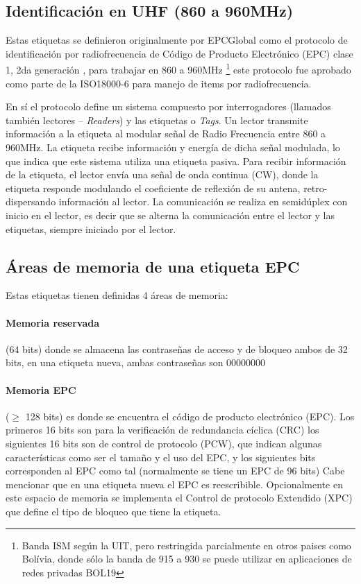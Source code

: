 \documentclass[fleqn,10pt]{SelfArx} %
\begin{document}
\subsection*{Identificación en UHF (860 a 960MHz)}

Estas etiquetas se definieron originalmente por EPCGlobal como el protocolo de identificación por radiofrecuencia de Código de Producto Electrónico (EPC) clase 1, 2da generación \cite{EPCGlobal:2008}, para trabajar en 860 a 960MHz \footnote{Banda ISM según la UIT, pero restringida parcialmente en otros paises como Bolívia, donde sólo la banda de 915 a 930 se puede utilizar en aplicaciones de redes privadas \cite{Telecomunicaciones:2012} BOL19} este protocolo fue aprobado como parte de la ISO18000-6 para manejo de items por radiofrecuencia.

En sí el protocolo define un sistema compuesto por interrogadores (llamados también lectores – \emph{Readers}) y las etiquetas o \emph{Tags}. Un lector transmite información a la etiqueta al modular señal de Radio Frecuencia entre 860 a 960MHz. La etiqueta recibe información y energía de dicha señal modulada, lo que indica que este sistema utiliza una etiqueta pasiva. Para recibir información de la etiqueta, el lector envía una señal de onda continua (CW), donde la etiqueta responde modulando el coeficiente de reflexión de su antena, retro-dispersando información al lector.  La comunicación se realiza en semidúplex con inicio en el lector, es decir que se alterna la comunicación entre el lector y las etiquetas, siempre iniciado por el lector.

\subsection*{Áreas de memoria de una etiqueta EPC}

Estas etiquetas tienen definidas 4 áreas de memoria:

\paragraph{Memoria reservada} (64 bits) donde se almacena las contraseñas de acceso y de bloqueo ambos de 32 bits, en una etiqueta nueva, ambas contraseñas son 00000000
\paragraph{Memoria EPC} ($\ge$ 128 bits) es donde se encuentra el código de producto electrónico (EPC). Los primeros 16 bits son para la verificación de redundancia cíclica (CRC) los siguientes 16 bits son de control de protocolo (PCW), que indican algunas características como ser el tamaño y el uso del EPC, y los siguientes bits corresponden al EPC como tal (normalmente se tiene un EPC de 96 bits) Cabe mencionar que en una etiqueta nueva el EPC es reescribible. Opcionalmente en este espacio de memoria se implementa el Control de protocolo Extendido (XPC) que define el tipo de bloqueo que tiene la etiqueta.
\end{document}
